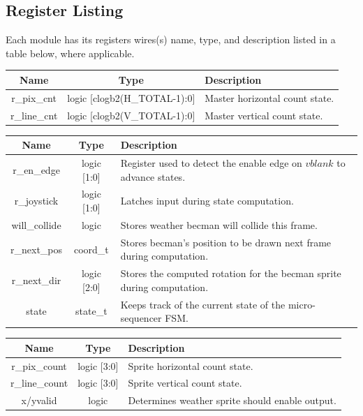 \documentclass[12pt]{article}
\begin{document}
%
%
\subsection{Register Listing}
Each module has its registers wires(s) name, type, and description listed in a table
below, where applicable.

\begingroup
{}
\label{tab:interface_vtg}
\begin{tabularx}{\linewidth}{ ||c|c|X|| }
    \hline
    Name & Type & Description \\
    \hline
    r\_pix\_cnt & logic [clogb2(H\_TOTAL-1):0] & Master horizontal count state.
    \\
    r\_line\_cnt & logic [clogb2(V\_TOTAL-1):0] & Master vertical count state.
    \\
    \hline
\end{tabularx}
\endgroup

\vspace{0.5in}
\begingroup
{}
\label{tab:interface_game_state}
\begin{tabularx}{\linewidth}{ ||c|c|X|| }
    \hline
    Name & Type & Description \\
    \hline
    r\_en\_edge & logic [1:0] & Register used to detect the enable edge on
    $vblank$ to advance states. \\
    r\_joystick & logic [1:0] & Latches input during state computation. \\
    will\_collide & logic & Stores weather becman will collide this frame. \\
    r\_next\_pos & coord\_t & Stores becman's position to be drawn next frame
    during computation. \\
    r\_next\_dir & logic [2:0] & Stores the computed rotation for the becman
    sprite during computation. \\
    state & state\_t & Keeps track of the current state of the micro-sequencer FSM.\\
    \hline
\end{tabularx}
\endgroup

\newpage

\vspace{0.5in}
\begingroup
{}
\label{tab:output_becman_sprite}
\begin{tabularx}{\linewidth}{ ||c|c|X|| }
    \hline
    Name & Type & Description \\
    \hline
    r\_pix\_count & logic [3:0] & Sprite horizontal count state.
    \\
    r\_line\_count & logic [3:0] & Sprite vertical count state. \\
    x/yvalid & logic & Determines weather sprite should enable output.
    \\
    \hline
\end{tabularx}
\endgroup
\end{document}
